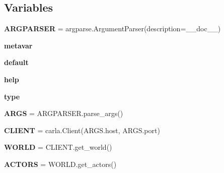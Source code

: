 \subsection*{Variables}
\begin{DoxyCompactItemize}
\item 
\mbox{\label{namespacescripts_1_1carla__plugin_a9147b8d018233e8bb5995067aebe955e}} 
{\bfseries A\+R\+G\+P\+A\+R\+S\+ER} = argparse.\+Argument\+Parser(description=\+\_\+\+\_\+doc\+\_\+\+\_\+)
\item 
\mbox{\label{namespacescripts_1_1carla__plugin_a66366fdfd79aa25a49eb498537a65281}} 
{\bfseries metavar}
\item 
\mbox{\label{namespacescripts_1_1carla__plugin_a035d94543e43903e49fb23d34cc11537}} 
{\bfseries default}
\item 
\mbox{\label{namespacescripts_1_1carla__plugin_a946fd43bfc0236f68844e99c96fd460f}} 
{\bfseries help}
\item 
\mbox{\label{namespacescripts_1_1carla__plugin_afdfb0e91fe9642b2d13091b50824fe06}} 
{\bfseries type}
\item 
\mbox{\label{namespacescripts_1_1carla__plugin_a0a21ce8917fbea215f92eb3c0054bff9}} 
{\bfseries A\+R\+GS} = A\+R\+G\+P\+A\+R\+S\+E\+R.\+parse\+\_\+args()
\item 
\mbox{\label{namespacescripts_1_1carla__plugin_a26e25d1b4dd569b149d2c93c1d71c11a}} 
{\bfseries C\+L\+I\+E\+NT} = carla.\+Client(A\+R\+G\+S.\+host, A\+R\+G\+S.\+port)
\item 
\mbox{\label{namespacescripts_1_1carla__plugin_a15e9a027e76ba03fa594a2799ac11077}} 
{\bfseries W\+O\+R\+LD} = C\+L\+I\+E\+N\+T.\+get\+\_\+world()
\item 
\mbox{\label{namespacescripts_1_1carla__plugin_a3a7267fa69f3e9f358430b7418216bf6}} 
{\bfseries A\+C\+T\+O\+RS} = W\+O\+R\+L\+D.\+get\+\_\+actors()

\end{DoxyCompactItemize}
